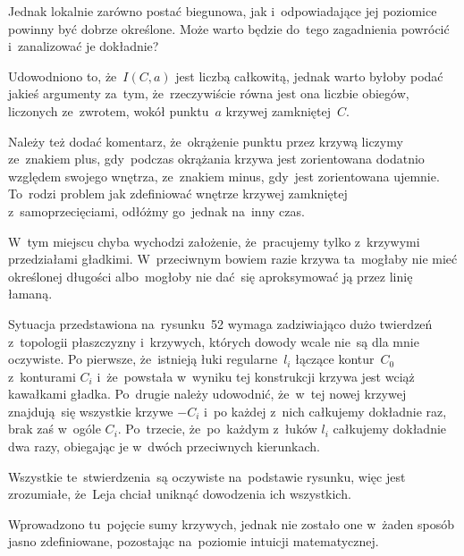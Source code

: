 \documentclass[a4paper,11pt]{article}
\begin{document}
Jednak lokalnie zarówno postać biegunowa, jak i~odpowiadające jej
poziomice powinny być dobrze określone. Może warto będzie do~tego
zagadnienia powrócić i~zanalizować je dokładnie?

\vspace{\spaceFour}



\start {} Udowodniono to, że~$I( C, a )$ jest liczbą
całkowitą, jednak warto byłoby podać jakieś argumenty za~tym,
że~rzeczywiście równa jest ona liczbie obiegów, liczonych ze~zwrotem,
wokół punktu~$a$ krzywej zamkniętej~$C$.

Należy też dodać komentarz, że~okrążenie punktu przez krzywą liczymy
ze~znakiem plus, gdy~podczas okrążania krzywa jest zorientowana
dodatnio względem swojego wnętrza, ze~znakiem minus, gdy~jest
zorientowana ujemnie. To~rodzi problem jak zdefiniować wnętrze krzywej
zamkniętej z~samoprzecięciami, odłóżmy go~jednak na~inny czas.

\vspace{\spaceFour}



\start {} W~tym miejscu chyba wychodzi założenie, że~pracujemy
tylko z~krzywymi przedziałami gładkimi. W~przeciwnym bowiem razie
krzywa ta~mogłaby nie mieć określonej długości albo~mogłoby nie
dać~się aproksymować ją przez linię łamaną.

\vspace{\spaceFour}



\start {} Sytuacja przedstawiona na~rysunku~52 wymaga
zadziwiająco dużo twierdzeń z~topologii płaszczyzny i~krzywych,
których dowody wcale nie~są dla mnie oczywiste. Po pierwsze,
że~istnieją łuki regularne~$l_{ i }$ łączące kontur~$C_{ 0 }$
z~konturami $C_{ i }$ i~że~powstała w~wyniku tej konstrukcji krzywa
jest wciąż kawałkami gładka. Po~drugie należy udowodnić, że~w~tej
nowej krzywej znajdują~się wszystkie krzywe $-C_{ i }$ i~po każdej
z~nich całkujemy dokładnie raz, brak zaś w~ogóle $C_{ i }$.
Po~trzecie, że~po~każdym z~łuków $l_{ i }$ całkujemy dokładnie dwa
razy, obiegając je w~dwóch przeciwnych kierunkach.

Wszystkie te~stwierdzenia~są oczywiste na~podstawie rysunku, więc jest
zrozumiałe, że~Leja chciał uniknąć dowodzenia ich wszystkich.

\vspace{\spaceFour}



\start {} Wprowadzono tu~pojęcie sumy krzywych, jednak nie
zostało one w~żaden sposób jasno zdefiniowane, pozostając na~poziomie
intuicji matematycznej.
\end{document}
